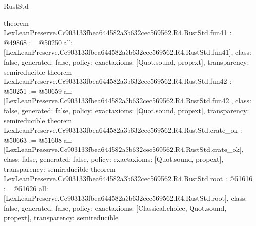 \begin{lexlean}{RustStd}
\begin{coremodule}
{}
theorem LexLeanPreserve.Cc903133fbea644582a3b632cec569562.R4.RustStd.fun41 : @49868 := @50250 {
  all: [LexLeanPreserve.Cc903133fbea644582a3b632cec569562.R4.RustStd.fun41],
  class: false,
  generated: false,
  policy: exact{axioms: [Quot.sound, propext]},
  transparency: semireducible
}
theorem LexLeanPreserve.Cc903133fbea644582a3b632cec569562.R4.RustStd.fun42 : @50251 := @50659 {
  all: [LexLeanPreserve.Cc903133fbea644582a3b632cec569562.R4.RustStd.fun42],
  class: false,
  generated: false,
  policy: exact{axioms: [Quot.sound, propext]},
  transparency: semireducible
}
theorem LexLeanPreserve.Cc903133fbea644582a3b632cec569562.R4.RustStd.crate_ok : @50663 := @51608 {
  all: [LexLeanPreserve.Cc903133fbea644582a3b632cec569562.R4.RustStd.crate_ok],
  class: false,
  generated: false,
  policy: exact{axioms: [Quot.sound, propext]},
  transparency: semireducible
}
theorem LexLeanPreserve.Cc903133fbea644582a3b632cec569562.R4.RustStd.root : @51616 := @51626 {
  all: [LexLeanPreserve.Cc903133fbea644582a3b632cec569562.R4.RustStd.root],
  class: false,
  generated: false,
  policy: exact{axioms: [Classical.choice, Quot.sound, propext]},
  transparency: semireducible
}


\end{coremodule}
\end{lexlean}
